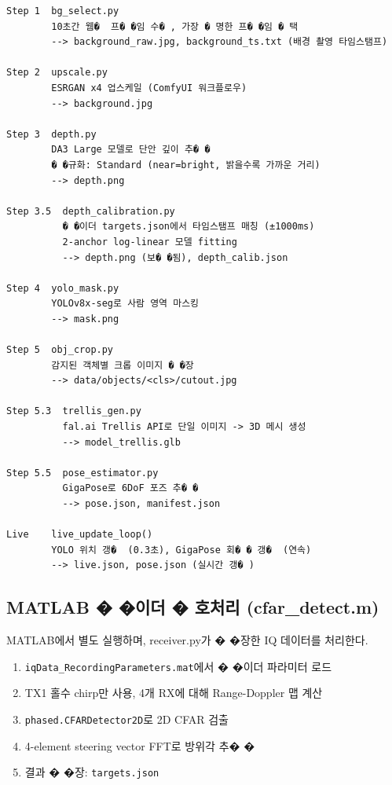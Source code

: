 \documentclass[a4paper,12pt]{article}
\begin{document}
\begin{lstlisting}[style=plain]
Step 1  bg_select.py
        10초간 웹�  프� �임 수� , 가장 � 명한 프� �임 � 택
        --> background_raw.jpg, background_ts.txt (배경 촬영 타임스탬프)

Step 2  upscale.py
        ESRGAN x4 업스케일 (ComfyUI 워크플로우)
        --> background.jpg

Step 3  depth.py
        DA3 Large 모델로 단안 깊이 추� �
        � �규화: Standard (near=bright, 밝을수록 가까운 거리)
        --> depth.png

Step 3.5  depth_calibration.py
          � �이더 targets.json에서 타임스탬프 매칭 (±1000ms)
          2-anchor log-linear 모델 fitting
          --> depth.png (보� �됨), depth_calib.json

Step 4  yolo_mask.py
        YOLOv8x-seg로 사람 영역 마스킹
        --> mask.png

Step 5  obj_crop.py
        감지된 객체별 크롭 이미지 � �장
        --> data/objects/<cls>/cutout.jpg

Step 5.3  trellis_gen.py
          fal.ai Trellis API로 단일 이미지 -> 3D 메시 생성
          --> model_trellis.glb

Step 5.5  pose_estimator.py
          GigaPose로 6DoF 포즈 추� �
          --> pose.json, manifest.json

Live    live_update_loop()
        YOLO 위치 갱�  (0.3초), GigaPose 회� � 갱�  (연속)
        --> live.json, pose.json (실시간 갱� )
\end{lstlisting}

\subsection{MATLAB � �이더 � 호처리 (cfar\_detect.m)}

MATLAB에서 별도 실행하며, receiver.py가 � �장한 IQ 데이터를 처리한다.

\begin{enumerate}[leftmargin=2em]
  \item \texttt{iqData\_RecordingParameters.mat}에서 � �이더 파라미터 로드
  \item TX1 홀수 chirp만 사용, 4개 RX에 대해 Range-Doppler 맵 계산
  \item \texttt{phased.CFARDetector2D}로 2D CFAR 검출
  \item 4-element steering vector FFT로 방위각 추� �
  \item 결과 � �장: \texttt{targets.json}
\end{enumerate}
\end{document}
